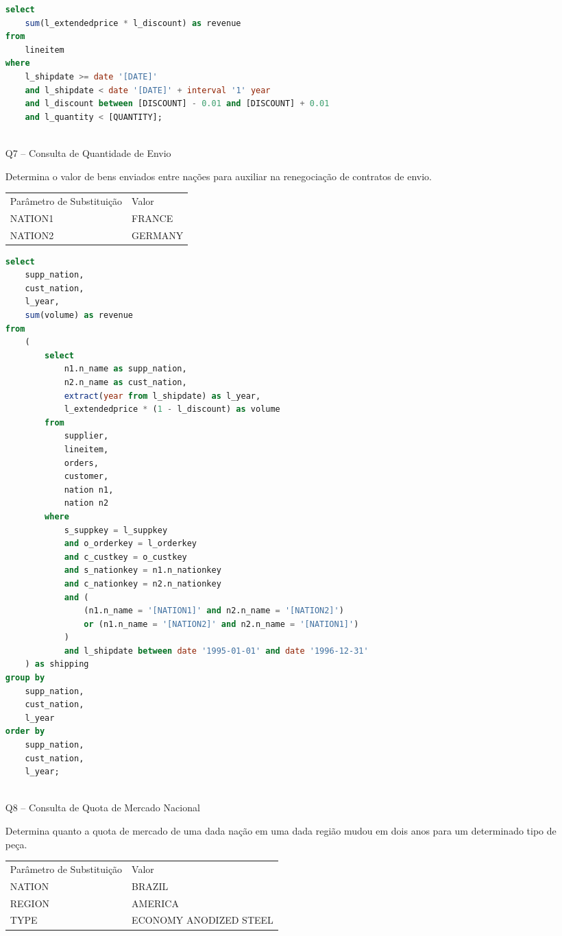 \begin{enumerate}
	\begin{lstlisting}[language=SQL]
select
	sum(l_extendedprice * l_discount) as revenue
from
	lineitem
where
	l_shipdate >= date '[DATE]'
	and l_shipdate < date '[DATE]' + interval '1' year
	and l_discount between [DISCOUNT] - 0.01 and [DISCOUNT] + 0.01
	and l_quantity < [QUANTITY];
	
	\end{lstlisting}
	
\item[Q7 --] Consulta de Quantidade de Envio

    Determina o valor de bens enviados entre nações para auxiliar na renegociação de contratos de envio.
    
\begin{tabular}{ll}
	Parâmetro de Substituição & Valor\\
	NATION1 & FRANCE\\
	NATION2 & GERMANY\\
\end{tabular}

	\begin{lstlisting}[language=SQL]
select
	supp_nation,
	cust_nation,
	l_year,
	sum(volume) as revenue
from
	(
		select
			n1.n_name as supp_nation,
			n2.n_name as cust_nation,
			extract(year from l_shipdate) as l_year,
			l_extendedprice * (1 - l_discount) as volume
		from
			supplier,
			lineitem,
			orders,
			customer,
			nation n1,
			nation n2
		where
			s_suppkey = l_suppkey
			and o_orderkey = l_orderkey
			and c_custkey = o_custkey
			and s_nationkey = n1.n_nationkey
			and c_nationkey = n2.n_nationkey
			and (
				(n1.n_name = '[NATION1]' and n2.n_name = '[NATION2]')
				or (n1.n_name = '[NATION2]' and n2.n_name = '[NATION1]')
			)
			and l_shipdate between date '1995-01-01' and date '1996-12-31'
	) as shipping
group by
	supp_nation,
	cust_nation,
	l_year
order by
	supp_nation,
	cust_nation,
	l_year;
	
	\end{lstlisting}

\item[Q8 --] Consulta de Quota de Mercado Nacional

    Determina quanto a quota de mercado de uma dada nação em uma dada região mudou em dois anos para um determinado tipo de peça.
    
\begin{tabular}{ll}
	Parâmetro de Substituição & Valor\\
	NATION & BRAZIL\\
	REGION & AMERICA\\
	TYPE &  ECONOMY ANODIZED STEEL\\
\end{tabular}


\end{enumerate}
